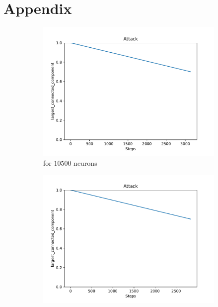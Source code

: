 \section{Appendix}


\begin{figure}
	\centering
	\begin{subfigure}[b]{0.45\textwidth}
		\centering
		\includegraphics[width=\textwidth]{Images/plots_rnd/rnd_20.pdf}
		\caption{for $10500$ neurons}
	\end{subfigure}
	\hfill
	\begin{subfigure}[b]{0.45\textwidth}
		\centering
		\includegraphics[width=\textwidth]{Images/plots_rnd/rnd_22.pdf}

\end{subfigure}
\end{figure}

